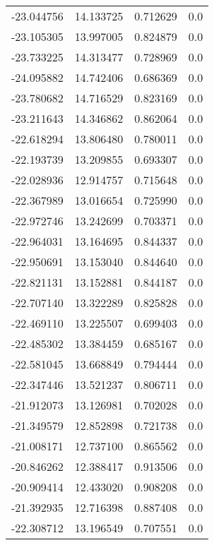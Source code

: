 \begin{tabular}{rrrr}
      -23.044756 &        14.133725 &    0.712629 &   0.0 \\
      -23.105305 &        13.997005 &    0.824879 &   0.0 \\
      -23.733225 &        14.313477 &    0.728969 &   0.0 \\
      -24.095882 &        14.742406 &    0.686369 &   0.0 \\
      -23.780682 &        14.716529 &    0.823169 &   0.0 \\
      -23.211643 &        14.346862 &    0.862064 &   0.0 \\
      -22.618294 &        13.806480 &    0.780011 &   0.0 \\
      -22.193739 &        13.209855 &    0.693307 &   0.0 \\
      -22.028936 &        12.914757 &    0.715648 &   0.0 \\
      -22.367989 &        13.016654 &    0.725990 &   0.0 \\
      -22.972746 &        13.242699 &    0.703371 &   0.0 \\
      -22.964031 &        13.164695 &    0.844337 &   0.0 \\
      -22.950691 &        13.153040 &    0.844640 &   0.0 \\
      -22.821131 &        13.152881 &    0.844187 &   0.0 \\
      -22.707140 &        13.322289 &    0.825828 &   0.0 \\
      -22.469110 &        13.225507 &    0.699403 &   0.0 \\
      -22.485302 &        13.384459 &    0.685167 &   0.0 \\
      -22.581045 &        13.668849 &    0.794444 &   0.0 \\
      -22.347446 &        13.521237 &    0.806711 &   0.0 \\
      -21.912073 &        13.126981 &    0.702028 &   0.0 \\
      -21.349579 &        12.852898 &    0.721738 &   0.0 \\
      -21.008171 &        12.737100 &    0.865562 &   0.0 \\
      -20.846262 &        12.388417 &    0.913506 &   0.0 \\
      -20.909414 &        12.433020 &    0.908208 &   0.0 \\
      -21.392935 &        12.716398 &    0.887408 &   0.0 \\
      -22.308712 &        13.196549 &    0.707551 &   0.0 \\

\end{tabular}
